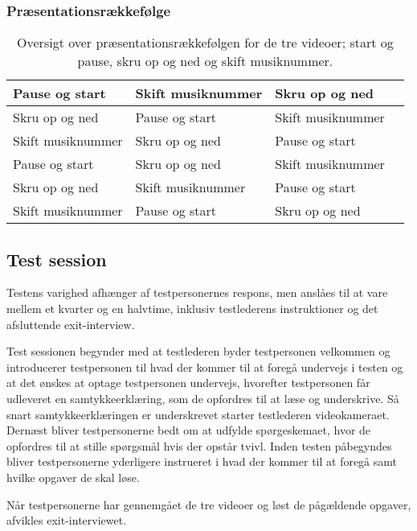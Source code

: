 \subsubsection{Præsentationsrækkefølge}
\label{PraesentationsraekkefoelgeValgAfGestikker}
%

%
\begin{table}[H]
	\centering
	\begin{tabular}{ | l | l | l | p{8cm} |}
		\hline
		Pause og start & Skift musiknummer & Skru op og ned \\ \hline
		Skru op og ned & Pause og start & Skift musiknummer\\ \hline
		Skift musiknummer & Skru op og ned & Pause og start \\ \hline
		Pause og start & Skru op og ned & Skift musiknummer\\ \hline
		Skru op og ned & Skift musiknummer & Pause og start\\ \hline
		Skift musiknummer & Pause og start & Skru op og ned \\ \hline
	\end{tabular}
	\caption{Oversigt over præsentationsrækkefølgen for de tre videoer; start og pause, skru op og ned og skift musiknummer.}
	\label{tab:PraesentationsraekkefoelgeValgAfGestikker}
\end{table}
\noindent
%




\subsection{Test session}
\label{TestSessionValgAfGestikker}
%
Testens varighed afhænger af testpersonernes respons, men anslåes til at vare mellem et kvarter og en halvtime, inklusiv testlederens instruktioner og det afsluttende exit-interview.

Test sessionen begynder med at testlederen byder testpersonen velkommen og introducerer testpersonen til hvad der kommer til at foregå undervejs i testen og at det ønskes at optage testpersonen undervejs, hvorefter testpersonen får udleveret en samtykkeerklæring, som de opfordres til at læse og underskrive. Så snart samtykkeerklæringen er underskrevet starter testlederen videokameraet. Dernæst bliver testpersonerne bedt om at udfylde spørgeskemaet, hvor de opfordres til at stille spørgsmål hvis der opstår tvivl. Inden testen påbegyndes bliver testpersonerne yderligere instrueret i hvad der kommer til at foregå samt hvilke opgaver de skal løse. 

Når testpersonerne har gennemgået de tre videoer og løst de pågældende opgaver, afvikles exit-interviewet. 
%

